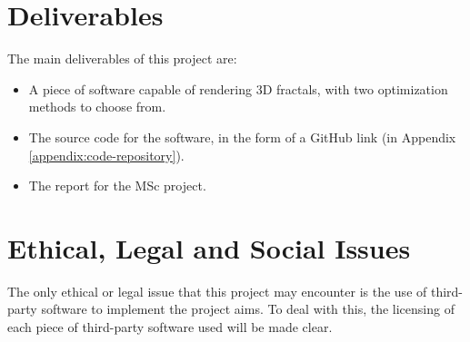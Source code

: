 \section{Deliverables}

The main deliverables of this project are:

\begin{itemize}
	\item A piece of software capable of rendering 3D fractals, with two optimization methods to choose from.
	\item The source code for the software, in the form of a GitHub link (in Appendix \ref{appendix:code-repository}).
	\item The report for the MSc project.
\end{itemize}

\section{Ethical, Legal and Social Issues}

The only ethical or legal issue that this project may encounter is the use of third-party software to implement the project aims. To deal with this, the licensing of each piece of third-party software used will be made clear.